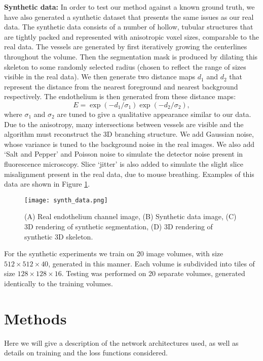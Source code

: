 \documentclass[journal,transmag]{IEEEtran}
\begin{document}
\textbf{Synthetic data:} In order to test our method against a known ground truth, we have also generated a synthetic dataset that presents the same issues as our real data. The synthetic data consists of a number of hollow, tubular structures that are tightly packed and represented with anisotropic voxel sizes, comparable to the real data. The vessels are generated by first iteratively growing the centerlines throughout the volume. Then the segmentation mask is produced by dilating this skeleton to some randomly selected radius (chosen to reflect the range of sizes visible in the real data). We then generate two distance maps $d_1$ and $d_2$ that represent the distance from the nearest foreground and nearest background respectively. The endothelium is then generated from these distance maps:
\[
E = \exp(-d_1 / \sigma_1 ) \exp(-d_2 / \sigma_2),
\]
where $\sigma_1$ and $\sigma_2$ are tuned to give a qualitative appearance similar to our data.
 Due to the anisotropy, many intersections between vessels are visible and the algorithm must reconstruct the 3D branching structure. We add Gaussian noise, whose variance is tuned to the background noise in the real images. We also add `Salt and Pepper' and Poisson noise to simulate the detector noise present in fluorescence microscopy. Slice `jitter' is also added to simulate the slight slice misalignment present in the real data, due to mouse breathing. Examples of this data are shown in Figure \ref{fig:synthetic_data}.

\begin{figure}
\centering
\texttt{[image: synth\_data.png]}
\caption{(A) Real endothelium channel image, (B) Synthetic data image, (C) 3D rendering of synthetic segmentation, (D) 3D rendering of synthetic 3D skeleton.}
\label{fig:synthetic_data}
\end{figure}

For the synthetic experiments we train on 20 image volumes, with size $512 \times 512 \times 40$, generated in this manner. Each volume is subdivided into tiles of size $128 \times 128 \times 16$. Testing was performed on 20 separate volumes, generated identically to the training volumes.

\section{Methods}
Here we will give a description of the network architectures used, as well as details on training and the loss functions considered.
\end{document}
